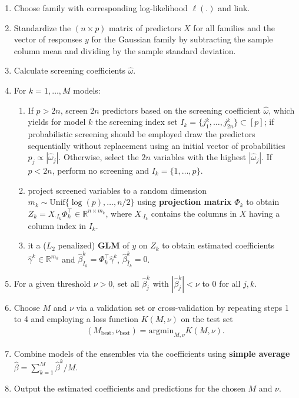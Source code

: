 \documentclass[
  article,
  nojss]{jss}
\providecommand{\tightlist}{%
  \setlength{\itemsep}{0pt}\setlength{\parskip}{0pt}}\usepackage{longtable,booktabs,array}
\begin{document}
\begin{enumerate}
\def\labelenumi{\arabic{enumi}.}
\tightlist
\item
  Choose family with corresponding log-likelihood \(\ell(.)\) and link.
\item
  Standardize the \((n\times p)\) matrix of predictors \(X\) for all
  families and the vector of responses \(y\) for the Gaussian family by
  subtracting the sample column mean and dividing by the sample standard
  deviation.
\item
  Calculate screening coefficients \(\hat\omega\).
\item
  For \(k=1,\dots,M\) models:

  \begin{enumerate}
  \def\labelenumii{\arabic{enumii}.}
  \tightlist
  \item
    If \(p>2n\), screen \(2n\) predictors based on the screening
    coefficient \(\hat\omega\), which yields for model \(k\) the
    screening index set \(I_k=\{j_1^k,\dots,j_{2n}^k\}\subset[p]\); if
    probabilistic screening should be employed draw the predictors
    sequentially without replacement using an initial vector of
    probabilities \(p_j\propto |\hat\omega_j|\). Otherwise, select the
    \(2n\) variables with the highest \(|\hat\omega_j|\). If \(p < 2n\),
    perform no screening and \(I_k=\{1,\dots,p\}\).
  \item
    project screened variables to a random dimension
    \(m_k\sim \text{Unif}\{\log(p),\dots,n/2\}\) using
    \textbf{projection matrix} \(\Phi_k\) to obtain
    \(Z_k=X_{\cdot I_k}\Phi_k^\top \in \mathbb{R}^{n\times m_k}\), where
    \(X_{\cdot I_k}\) contains the columns in \(X\) having a column
    index in \(I_k\).
  \item
    it a (\(L_2\) penalized) \textbf{GLM} of \(y\) on \(Z_k\) to obtain
    estimated coefficients \(\widehat\gamma^k\in\mathbb{R}^{m_k}\) and
    \(\hat \beta_{I_k}^k=\Phi_k^\top\widehat\gamma^k\),
    \(\hat \beta_{\bar I_k}^k=0\).
  \end{enumerate}
\item
  For a given threshold \(\nu>0\), set all \(\hat\beta_j^k\) with
  \(|\hat\beta_j^k|<\nu\) to \(0\) for all \(j,k\).
\item
  Choose \(M\) and \(\nu\) via a validation set or cross-validation by
  repeating steps 1 to 4 and employing a loss function \(K(M, \nu)\) on
  the test set \begin{align*}
        (M_{\text{best}},\nu_{\text{best}}) = \text{argmin}_{M,\nu}K(M,\nu).
      \end{align*}
\item
  Combine models of the ensembles via the coefficients using
  \textbf{simple average} \(\hat \beta = \sum_{k=1}^M\hat \beta^k / M\).
\item
  Output the estimated coefficients and predictions for the chosen \(M\)
  and \(\nu\).
\end{enumerate}
\end{document}
